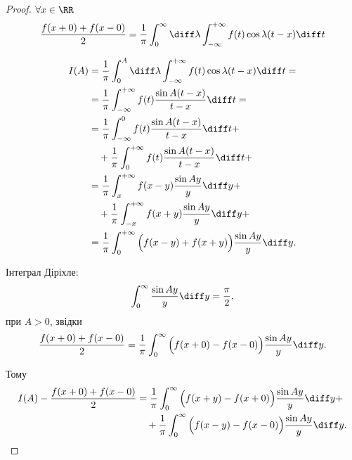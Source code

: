 \begin{proof}
    $\forall x \in \RR$
    \begin{equation}
        \frac{f(x + 0) + f(x - 0)}{2} = \frac{1}{\pi} \int_0^\infty \diff \lambda \int_{-\infty}^{+\infty} f(t) \cos \lambda (t - x) \diff t
    \end{equation}

    \begin{equation}
        \begin{aligned}
            I(A)
            &= \frac{1}{\pi} \int_0^A \diff \lambda \int_{-\infty}^{+\infty} f(t) \cos \lambda (t - x) \diff t = \\
            &= \frac{1}{\pi} \int_{-\infty}^{+\infty} f(t) \frac{\sin A (t - x)}{t - x} \diff t = \\
            &= \frac{1}{\pi} \int_{-\infty}^0 f(t) \frac{\sin A (t - x)}{t - x} \diff t + \\
            &\quad + \frac{1}{\pi} \int_0^{+\infty} f(t) \frac{\sin A (t - x)}{t - x} \diff t + \\
            &= \frac{1}{\pi} \int_x^{+\infty} f(x - y) \frac{\sin A y}{y} \diff y + \\
            &\quad + \frac{1}{\pi} \int_{-x}^{+\infty} f(x + y) \frac{\sin A y}{y} \diff y + \\
            &= \frac{1}{\pi} \int_0^{+\infty} \Big( f(x - y) + f(x + y) \Big) \frac{\sin A y}{y} \diff y.
        \end{aligned}
    \end{equation}

    Інтеграл Діріхле:
    \begin{equation}
        \int_0^\infty \frac{\sin A y}{y} \diff y = \frac{\pi}{2},
    \end{equation}
    при $A > 0$, звідки
    \begin{equation}
        \frac{f(x + 0) + f(x - 0)}{2} = \frac{1}{\pi} \int_0^\infty \Big( f(x + 0) - f(x - 0) \Big) \frac{\sin A y}{y} \diff y.
    \end{equation}

    Тому
    \begin{equation}
        \begin{aligned}
            I(A) - \frac{f(x + 0) + f(x - 0)}{2}
            &= \frac{1}{\pi} \int_0^\infty \Big( f(x + y) - f(x + 0) \Big) \frac{\sin A y}{y} \diff y + \\
            &\quad + \frac{1}{\pi} \int_0^\infty \Big( f(x - y) - f(x - 0) \Big) \frac{\sin A y}{y} \diff y.
        \end{aligned}
    \end{equation}


\end{proof}
